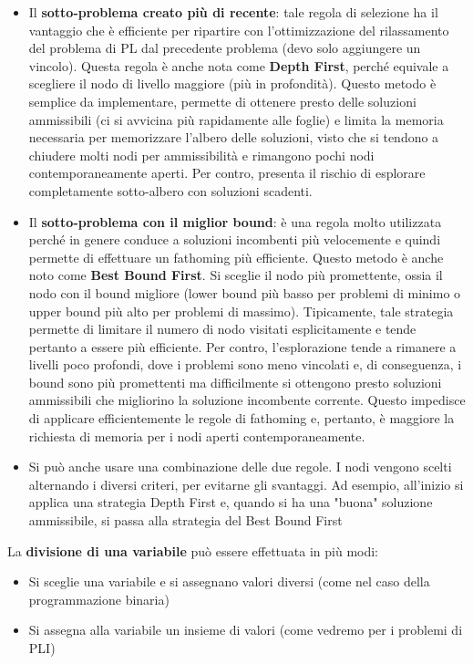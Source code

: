 \documentclass[12pt]{article}
\begin{document}
\begin{itemize}
    \item Il \textbf{sotto-problema creato più di recente}: tale regola di selezione ha il vantaggio che è efficiente
    per ripartire con l'ottimizzazione del rilassamento del problema di PL dal precedente problema (devo solo aggiungere un vincolo).
    Questa regola è anche nota come \textbf{Depth First}, perché equivale a scegliere il nodo di livello maggiore (più in profondità).
    Questo metodo è semplice da implementare, permette di ottenere presto delle soluzioni ammissibili (ci si avvicina più rapidamente alle foglie) e limita la memoria necessaria per memorizzare l'albero delle
    soluzioni, visto che si tendono a chiudere molti nodi per ammissibilità e rimangono pochi nodi contemporaneamente aperti. Per contro, presenta il rischio di esplorare completamente sotto-albero con soluzioni scadenti.
    \item Il \textbf{sotto-problema con il miglior bound}: è una regola molto utilizzata perché in genere conduce a soluzioni incombenti più velocemente e quindi
    permette di effettuare un fathoming più efficiente. Questo metodo è anche noto come \textbf{Best Bound First}. Si sceglie il nodo più promettente, ossia il nodo con il bound migliore (lower bound più basso per problemi di minimo o 
    upper bound più alto per problemi di massimo). Tipicamente, tale strategia permette di limitare il numero di nodo visitati esplicitamente e tende pertanto a essere più efficiente.
    Per contro, l'esplorazione tende a rimanere a livelli poco profondi, dove i problemi sono meno vincolati e, di conseguenza, i bound sono più promettenti ma difficilmente si ottengono presto soluzioni ammissibili che migliorino la soluzione incombente corrente.
    Questo impedisce di applicare efficientemente le regole di fathoming e, pertanto, è maggiore la richiesta di memoria per i nodi aperti contemporaneamente.
    \item Si può anche usare una combinazione delle due regole. I nodi vengono scelti alternando i diversi criteri, per evitarne gli svantaggi. Ad esempio, all'inizio si applica una strategia Depth First e, quando si ha una "buona" soluzione ammissibile, si passa alla strategia del Best Bound First
\end{itemize}
La \textbf{divisione di una variabile} può essere effettuata in più modi:
\begin{itemize}
    \item Si sceglie una variabile e si assegnano valori diversi (come nel caso della programmazione binaria)
    \item Si assegna alla variabile un insieme di valori (come vedremo per i problemi di PLI)
\end{itemize}
\end{document}
